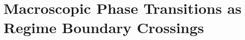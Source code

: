 \chapter{Macroscopic Phase Transitions as Regime Boundary Crossings}
\label{ch:phase_transitions}



